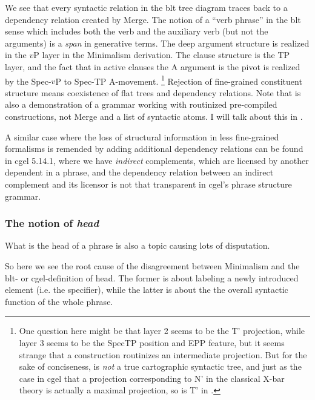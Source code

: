 \documentclass[../main.tex]{subfiles}
\begin{document}
We see that every syntactic relation in the \ac{blt} tree diagram traces back to a dependency relation created 
by Merge. The notion of a ``verb phrase'' in the \ac{blt} sense which includes both the verb and the auxiliary 
verb (but not the arguments) is a \emph{span} in generative terms. The deep argument structure is realized 
in the $v$P layer in the Minimalism derivation. The clause structure is the TP layer, and the fact that 
in active clauses the A argument is the pivot is realized by the Spec-$v$P to Spec-TP A-movement.%
\footnote{One question here might be that layer 2 seems to be the T' projection, while layer 3 seems to be 
the SpecTP position and EPP feature, but it seems strange that a construction routinizes an intermediate
projection. But for the sake of conciseness,  is \emph{not} 
a true cartographic syntactic tree, and just as the case in \ac{cgel} that a projection corresponding to 
N' in the classical X-bar theory is actually a maximal projection, so is T' in .}
Rejection of fine-grained constituent structure means coexistence of flat trees and dependency relations.
Note that  is also a demonstration of a grammar working with 
routinized pre-compiled constructions, not Merge and a list of syntactic atoms. I will 
talk about this in .

A similar case where the loss of structural information in less fine-grained formalisms
is remended by adding additional dependency relations can be found in \ac{cgel} 5.14.1, where 
we have \emph{indirect} complements, which are licensed by another dependent in a phrase, 
and the dependency relation between an indirect complement and its licensor is not that 
transparent in \ac{cgel}'s phrase structure grammar.

\subsubsection{The notion of \emph{head}}\label{sec:headedness}

What is the head of a phrase is also a topic causing lots of disputation. 

So here we see the root cause of the disagreement between Minimalism and the \ac{blt}- or \ac{cgel}-definition 
of head. The former is about labeling a newly introduced element (i.e. the specifier), while the latter is about 
the the overall syntactic function of the whole phrase. 
\end{document}
